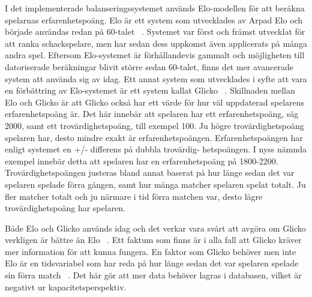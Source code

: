 \documentclass[a4paper, 11pt]{article}
\begin{document}
I det implementerade balanseringssystemet används Elo-modellen för att beräkna spelarnas erfarenhetspoäng. Elo är ett system som utvecklades av Arpad Elo och började användas redan på 60-talet ~\cite{elo}. Systemet var först och främst utvecklat för att ranka schackspelare, men har sedan dess uppkomst även applicerats på många andra spel. Eftersom Elo-systemet är förhållandevis gammalt och möjligheten till datoriserade beräkningar blivit större sedan 60-talet, finns det mer avancerade system att använda sig av idag. Ett annat system som utvecklades i syfte att vara en förbättring av Elo-systemet är ett system kallat Glicko ~\cite{chessratings}. Skillnaden mellan Elo och Glicko är att Glicko också har ett värde för hur väl uppdaterad spelarens erfarenhetspoäng är. Det här innebär att spelaren har ett erfarenhetspoäng, säg 2000, samt ett trovärdighetspoäng, till exempel 100. Ju högre trovärdighetspoäng spelaren har, desto mindre exakt är erfarenhetspoängen. Erfarenhetspoängen har enligt systemet en +/- differens på dubbla
trovärdig-
hetspoängen. I nyss nämnda exempel innebär detta att spelaren har en erfarenhetspoäng på 1800-2200. Trovärdighetspoängen justeras bland annat baserat på hur länge sedan det var spelaren spelade förra gången, samt hur många matcher spelaren spelat totalt. Ju fler matcher totalt och ju närmare i tid förra matchen var, desto lägre trovärdighetspoäng har spelaren.

Både Elo och Glicko används idag och det verkar vara svårt att avgöra om Glicko verkligen är bättre än Elo ~\cite{stackchess}. Ett faktum som finns är i alla fall att Glicko kräver mer information för att kunna fungera. En faktor som Glicko behöver men inte Elo är en tidsvariabel som har reda på hur länge sedan det var spelaren spelade sin förra match ~\cite{glickoex}. Det här gör att mer data behöver lagras i databasen, vilket är negativt ur kapacitetsperspektiv.
\end{document}
